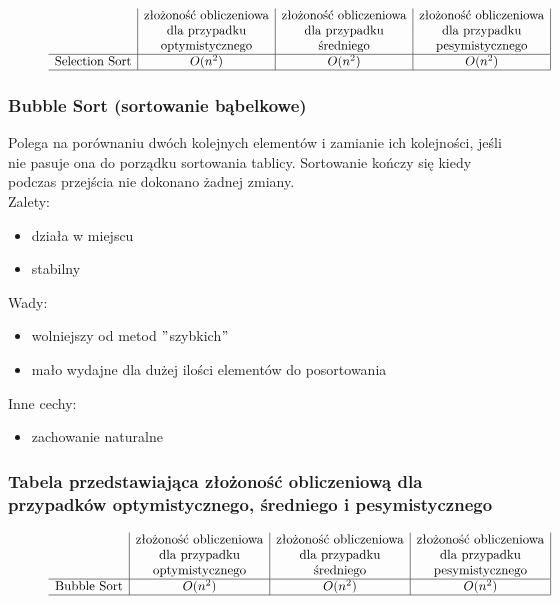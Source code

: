 \documentclass[polish,polish,a4paper]{article}
\begin{document}
\begin{spacing}{1.5}
\begin{figure}[H]
\begin{equation*}
\begin{array}{l|c|c|c|}
		&$złożoność obliczeniowa$&$złożoność obliczeniowa$&$złożoność obliczeniowa$\\
		&$dla przypadku$&$dla przypadku$&$dla przypadku$\\
		&$optymistycznego$&$średniego$&$pesymistycznego$\\
		\hline
		$Selection Sort$&O(n^2)&O(n^2)&O(n^2)\\
		\hline
		\end{array}
		\end{equation*}
	\end{figure}
	
	
			\subsubsection*{Bubble Sort (sortowanie bąbelkowe)}
			Polega na porównaniu dwóch kolejnych elementów i zamianie ich kolejności, jeśli nie pasuje ona do porządku sortowania tablicy. Sortowanie kończy się kiedy podczas przejścia nie dokonano żadnej zmiany.\\
			
	Zalety:
	\begin{itemize}
		\item działa w miejscu
		\item stabilny 
	\end{itemize}
	Wady:
	\begin{itemize}
		\item wolniejszy od metod $ " $szybkich$ " $
		\item mało wydajne dla dużej ilości elementów do posortowania
	\end{itemize}
	Inne cechy:
	\begin{itemize}
		\item zachowanie naturalne
	\end{itemize}
	
	
	\subsubsection*{Tabela przedstawiająca złożoność obliczeniową dla przypadków optymistycznego, średniego i pesymistycznego} 
	
	\begin{figure}[H]
			\begin{equation*}
		\begin{array}{l|c|c|c|}

		&$złożoność obliczeniowa$&$złożoność obliczeniowa$&$złożoność obliczeniowa$\\
		&$dla przypadku$&$dla przypadku$&$dla przypadku$\\
		&$optymistycznego$&$średniego$&$pesymistycznego$\\
		\hline
		$Bubble Sort$&O(n^2)&O(n^2)&O(n^2)\\
		\hline
		\end{array}
		\end{equation*}
	\end{figure}


\end{spacing}
\end{document}

